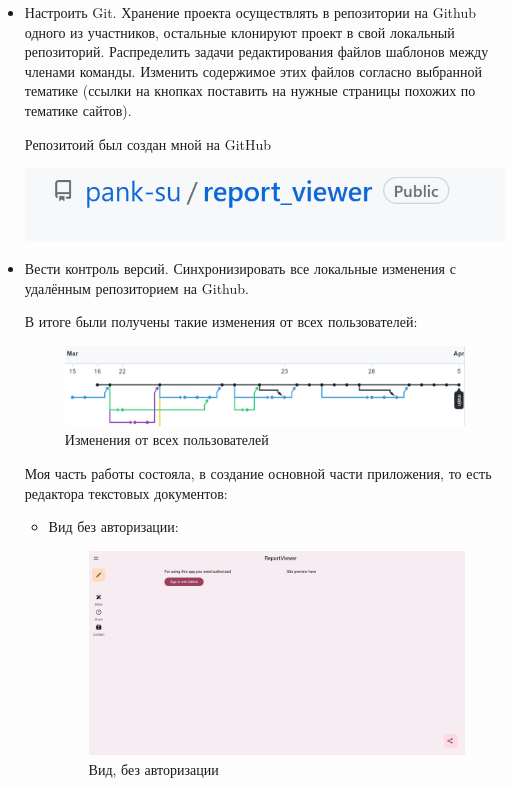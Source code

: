 \documentclass[14pt]{extarticle}
\begin{document}
\begin{itemize}
\item Настроить Git. Хранение проекта осуществлять в репозитории на Github одного из участников, остальные клонируют проект в свой локальный репозиторий. Распределить задачи редактирования файлов шаблонов между членами команды. Изменить содержимое этих файлов согласно выбранной тематике (ссылки на кнопках поставить на нужные страницы похожих по тематике сайтов).

Репозитоий был создан мной на GitHub

\begin{center}
\includegraphics[width=.9\linewidth]{images/2023-04-05_09-33-51_screenshot.png}
\end{center}

\item Вести контроль версий. Синхронизировать все локальные изменения с удалённым репозиторием на Github.

В итоге были получены такие изменения от всех пользователей:
\begin{figure}[H]
\centering
\includegraphics[width=.9\linewidth]{images/2023-04-05_09-35-15_screenshot.png}
\caption{Изменения от всех пользователей}
\end{figure}

Моя часть работы состояла, в создание основной части приложения, то есть редактора текстовых документов:
\begin{itemize}
\item Вид без авторизации:

\begin{figure}[H]
\centering
\includegraphics[width=.9\linewidth]{images/2023-04-05_09-41-07_screenshot.png}
\caption{Вид, без авторизации}
\end{figure}


\end{itemize}
\end{itemize}
\end{document}
